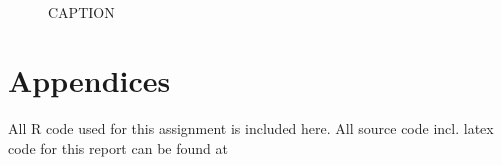 \begin{figure}
    \mbox{ \quad 
            }
    \caption{CAPTION}
    \label{fig:label}
\end{figure}

\FloatBarrier

\pagebreak

\renewcommand\thesection{\Alph{section}}
\section{Appendices}

All R code used for this assignment is included here. All source code incl.
latex code for this report can be found at \githuburl

%

\pagebreak




